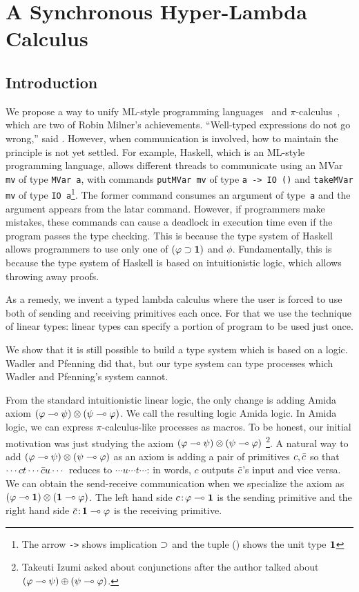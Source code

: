 \chapter{A Synchronous Hyper-Lambda Calculus}
\label{ch:exchange}

\section{Introduction}

We propose a way to unify ML-style programming
languages~\citep{milner1997definition, marlow2010haskell} and
$\pi$-calculus~\citep{milner1999communicating}, which are two of Robin
Milner's achievements.
``Well-typed expressions do not go wrong,'' said \citet{milner1978}.
However, when communication is involved, how to maintain the principle
is not yet settled.
For example, Haskell, which is an ML-style programming language,
allows different threads to communicate using an MVar \texttt{mv} of
type \texttt{MVar
a}, with commands
\texttt{putMVar mv} of type \texttt{a -> IO ()} and \texttt{takeMVar mv}
of type \texttt{IO
a}\footnote{The arrow \texttt{->} shows implication $\supset$ and the tuple
() shows the unit type $\mathbf{1}$}.
The former command consumes an argument of type~\texttt{a} and
the argument appears from the latar command.
However, if programmers make mistakes, these commands can
cause a deadlock in execution time even if the program passes the type
checking.
This is because the type system of Haskell allows programmers to
use only one of $(\varphi\supset \mathbf{1})$ and $\phi$.
Fundamentally, this is because the type system of Haskell
is based on intuitionistic logic, which allows throwing away proofs.

As a remedy, we invent a typed lambda calculus where
the user is forced to use both of sending and receiving primitives each once.
For that we use the technique of linear types:
linear types can specify a portion of program to be used
just once.

We show that it is still possible to build
a type system which is based on a logic.
Wadler and Pfenning did that, but our type system can type processes
which Wadler
and Pfenning's system cannot.

From the standard intuitionistic linear logic,
the only change is adding Amida axiom
$(\varphi\multimap\psi)\otimes(\psi\multimap\varphi)$.
We call the resulting logic Amida logic.
In Amida logic, we can express $\pi$-calculus-like processes as macros.
To be honest, our initial motivation was just studying the axiom
$(\varphi\multimap\psi)\otimes(\psi\multimap\varphi)$%
\footnote{Takeuti Izumi asked about conjunctions
after the author talked about $(\varphi\multimap\psi)\oplus (\psi\multimap\varphi)$.}.
A natural way to add $(\varphi\multimap\psi)\otimes(\psi\multimap\varphi)$ as an axiom
is adding a pair of primitives $c,\bar{c}$ so that
$\cdots ct \cdots \bar{c} u \cdots$ reduces to
$\cdots u  \cdots t \cdots$: in words,
$c$ outputs $\bar{c}$'s input and vice versa.
We can obtain the send-receive communication when we specialize the
axiom as $(\varphi\multimap \mathbf{1})\otimes(\mathbf{1}\multimap\varphi)$.  The left hand side
${c} \mathord{\colon\kern -2pt}{\varphi\multimap\mathbf{1}}$ is the sending primitive and
the right hand side ${\bar{c}} \mathord{\colon\kern -2pt}{\mathbf{1} \multimap\varphi}$ is the receiving
primitive.

